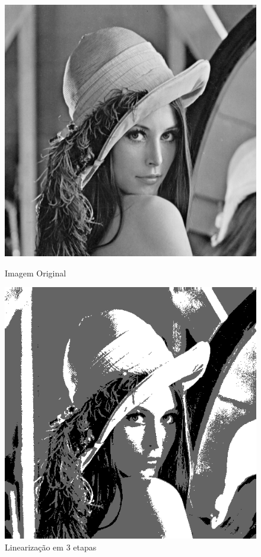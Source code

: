 \documentclass{article}
\begin{document}
\newpage
\begin{figure}[!htb]
\begin{minipage}[b]{0.45\linewidth}
\centering
\includegraphics[scale=0.32]{lena_B.png}
\caption{Imagem Original}
\label{fig:original}
\end{minipage}
\hspace{0.5cm}
\begin{minipage}[b]{0.45\linewidth}
\centering
\includegraphics[scale=0.32]{LinearizacaoMultipla.png}
\caption{Linearização em 3 etapas}
\label{fig:rota}
\end{minipage}
\end{figure}
\end{document}
